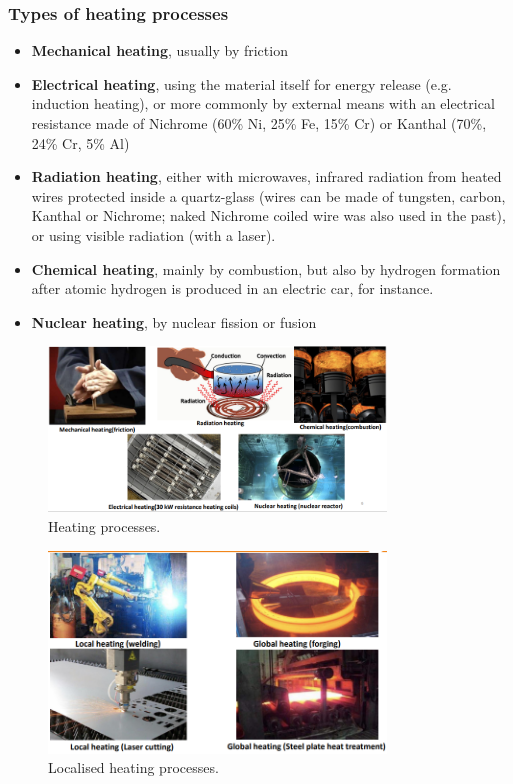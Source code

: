 \subsubsection{Types of heating processes}
\begin{itemize}
    \item \textbf{Mechanical heating}, usually by friction
    \item \textbf{Electrical heating}, using the material itself for energy release (e.g. induction heating), or more commonly by external means with an electrical resistance made of Nichrome (60\% Ni, 25\% Fe, 15\% Cr) or Kanthal (70\%, 24\% Cr, 5\% Al)
    \item \textbf{Radiation heating}, either with microwaves, infrared radiation from heated wires protected inside a quartz-glass (wires can be made of tungsten, carbon, Kanthal or Nichrome; naked Nichrome coiled wire was also used in the past), or using visible radiation (with a laser).
    \item \textbf{Chemical heating}, mainly by combustion, but also by hydrogen formation after atomic hydrogen is produced in an electric car, for instance.
    \item \textbf{Nuclear heating}, by nuclear fission or fusion
\end{itemize}
\begin{figure}[H]
    \centering
    \includegraphics[width = 0.8\textwidth]{img/figure41.png}
    \caption{Heating processes.}
\end{figure}
\begin{figure}[H]
    \centering
    \includegraphics[width = 0.8\textwidth]{img/figure40.png}
    \caption{Localised heating processes.}
\end{figure}
